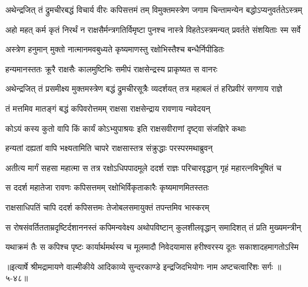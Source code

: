 \twolineshloka
{अथेन्द्रजित् तं द्रुमचीरबद्धं विचार्य वीरः कपिसत्तमं तम्}
{विमुक्तमस्त्रेण जगाम चिन्तामन्येन बद्धोऽप्यनुवर्ततेऽस्त्रम्} %

\twolineshloka
{अहो महत् कर्म कृतं निरर्थं न राक्षसैर्मन्त्रगतिर्विमृष्टा}
{पुनश्च नास्त्रे विहतेऽस्त्रमन्यत् प्रवर्तते संशयिताः स्म सर्वे} %

\twolineshloka
{अस्त्रेण हनुमान् मुक्तो नात्मानमवबुध्यते}
{कृष्यमाणस्तु रक्षोभिस्तैश्च बन्धैर्निपीडितः} %

\twolineshloka
{हन्यमानस्ततः क्रूरै राक्षसैः कालमुष्टिभिः}
{समीपं राक्षसेन्द्रस्य प्राकृष्यत स वानरः} %

\twolineshloka
{अथेन्द्रजित् तं प्रसमीक्ष्य मुक्तमस्त्रेण बद्धं द्रुमचीरसूत्रैः}
{व्यदर्शयत् तत्र महाबलं तं हरिप्रवीरं सगणाय राज्ञे} %

\twolineshloka
{तं मत्तमिव मातङ्गं बद्धं कपिवरोत्तमम्}
{राक्षसा राक्षसेन्द्राय रावणाय न्यवेदयन्} %

\twolineshloka
{कोऽयं कस्य कुतो वापि किं कार्यं कोऽभ्युपाश्रयः}
{इति राक्षसवीराणां दृष्ट्वा संजज्ञिरे कथाः} %

\twolineshloka
{हन्यतां दह्यतां वापि भक्ष्यतामिति चापरे}
{राक्षसास्तत्र संक्रुद्धाः परस्परमथाब्रुवन्} %

\twolineshloka
{अतीत्य मार्गं सहसा महात्मा स तत्र रक्षोऽधिपपादमूले}
{ददर्श राज्ञः परिचारवृद्धान् गृहं महारत्नविभूषितं च} %

\twolineshloka
{स ददर्श महातेजा रावणः कपिसत्तमम्}
{रक्षोभिर्विकृताकारैः कृष्यमाणमितस्ततः} %

\twolineshloka
{राक्षसाधिपतिं चापि ददर्श कपिसत्तमः}
{तेजोबलसमायुक्तं तपन्तमिव भास्करम्} %

\twolineshloka
{स रोषसंवर्तितताम्रदृष्टिर्दशाननस्तं कपिमन्ववेक्ष्य}
{अथोपविष्टान् कुलशीलवृद्धान् समादिशत् तं प्रति मुख्यमन्त्रीन्} %

\twolineshloka
{यथाक्रमं तैः स कपिश्च पृष्टः कार्यार्थमर्थस्य च मूलमादौ}
{निवेदयामास हरीश्वरस्य दूतः सकाशादहमागतोऽस्मि} %


॥इत्यार्षे श्रीमद्रामायणे वाल्मीकीये आदिकाव्ये सुन्दरकाण्डे इन्द्रजिदभियोगः नाम अष्टचत्वारिंशः सर्गः ॥५-४८॥
